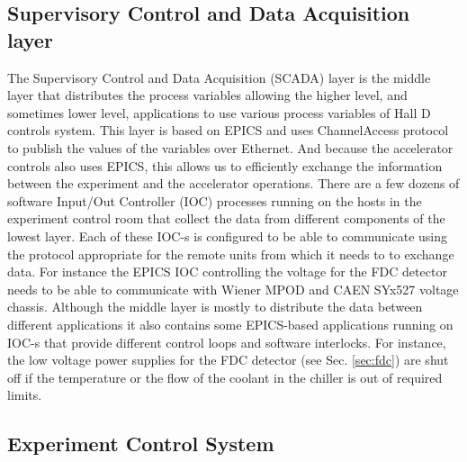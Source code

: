 \subsection{Supervisory Control and Data Acquisition layer \label{sec:archiver}}
The Supervisory Control and Data Acquisition (SCADA) layer is the middle layer that distributes the process variables allowing the higher level, and sometimes lower level, applications to use various process variables of Hall D controls system. This layer is based on EPICS and uses  ChannelAccess protocol to publish the values of the variables over Ethernet. And because the accelerator controls also uses EPICS, this allows us to efficiently exchange the information between the experiment and the accelerator operations. There are a few dozens of software Input/Out Controller (IOC) processes running on the hosts in the experiment control room that collect the data from different components of the lowest layer. Each of these IOC-s is configured to be able to communicate using the protocol appropriate for the remote units from which it needs to to exchange data. For instance the EPICS IOC controlling the voltage for the FDC detector needs to be able to communicate with Wiener MPOD and CAEN SYx527 voltage chassis. Although the middle layer is mostly to distribute the data between different applications it also contains some EPICS-based applications running on IOC-s that provide different control loops and software interlocks.  For instance, the low voltage power supplies for the FDC detector (see Sec. \ref{sec:fdc}) are shut off if the temperature or the flow of the coolant in the chiller is out of required limits. 
\subsection{Experiment Control System \label{sec:alarms}}
